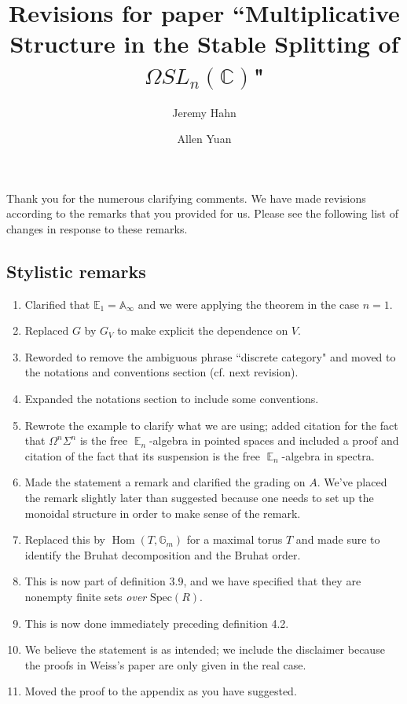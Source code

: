 \documentclass[reqno, oneside]{amsart}
\theoremstyle{definition}
\theoremstyle{plain}
\DeclareMathOperator{\Hom}{\text{Hom}}
\DeclareMathOperator{\E}{\mathbb{E}}
\begin{document}
\title{Revisions for paper ``Multiplicative Structure in the Stable Splitting of $\Omega SL_n(\mathbb{C})$"}
\author{Jeremy Hahn}
\address{Department of Mathematics, Harvard University, Cambridge, MA 02138}

\author{Allen Yuan}
\address{Department of Mathematics, Massachusetts Institute of Technology, Cambridge, MA 02139}



\maketitle

Thank you for the numerous clarifying comments.  We have made revisions according to the remarks that you provided for us.  Please see the following list of changes in response to these remarks.  

\subsection{Stylistic remarks}
\begin{enumerate}
\item Clarified that $\mathbb{E}_1 = \mathbb{A}_{\infty}$ and we were applying the theorem in the case $n=1$.  
\item Replaced $G$ by $G_V$ to make explicit the dependence on $V$.  
\item Reworded to remove the ambiguous phrase ``discrete category" and moved to the notations and conventions section (cf. next revision).
\item Expanded the notations section to include some conventions.  
\item Rewrote the example to clarify what we are using; added citation for the fact that $\Omega^n \Sigma^n$ is the free $\E_n$-algebra in pointed spaces and included a proof and citation of the fact that its suspension is the free $\E_n$-algebra in spectra.   
\item Made the statement a remark and clarified the grading on $A$.  We've placed the remark slightly later than suggested because one needs to set up the monoidal structure in order to make sense of the remark.  
\item Replaced this by $\Hom(T, \mathbb{G}_m)$ for a maximal torus $T$ and made sure to identify the Bruhat decomposition and the Bruhat order.  
\item  This is now part of definition 3.9, and we have specified that they are nonempty finite sets \emph{over} $\mathrm{Spec}(R)$.  
\item This is now done immediately preceding definition 4.2.  
\item We believe the statement is as intended; we include the disclaimer because the proofs in Weiss's paper are only given in the real case.  
\item Moved the proof to the appendix as you have suggested.  
\end{enumerate}
\end{document}
